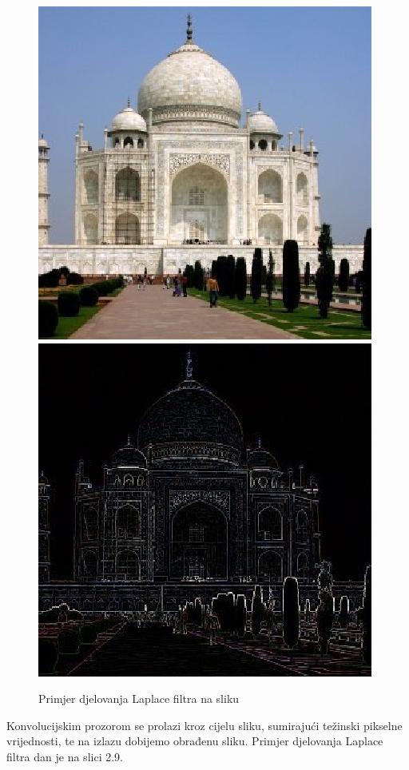 \documentclass[times, utf8, diplomski]{fer}
\begin{document}
\begin{figure}[htbp]
    \centering
    \includegraphics[scale=0.75]{Slike/taj_orig}
    \includegraphics[scale=0.75]{Slike/edge-taj-laplace}
    \caption{Primjer djelovanja Laplace filtra na sliku \cite{laplaceexample}}
\end{figure}

\pagebreak

Konvolucijskim prozorom se prolazi kroz cijelu sliku, sumirajući težinski pikselne vrijednosti, te na izlazu dobijemo obrađenu sliku. Primjer djelovanja Laplace filtra dan je na slici 2.9.\par
\end{document}
